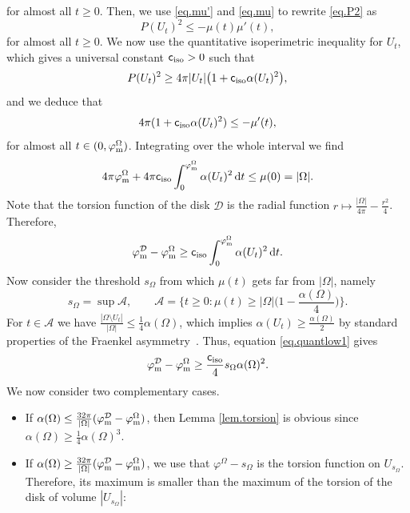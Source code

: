 \documentclass[11pt,a4paper]{amsart}
\def\dd{{\,\mathrm{d}}}
\numberwithin{figure}{section}
\numberwithin{equation}{section}
\theoremstyle{plain}%
\theoremstyle{remark}
\theoremstyle{plain}
\newcommand\cD{\mathcal D}
\newcommand\cF{\mathcal F}
\def\cD{{\mathcal D}}   \def\cE{{\mathcal E}}   \def\cF{{\mathcal F}}
\begin{document}
\begin{appendix}
		for almost all $t\geq 0$.
		Then, we use \eqref{eq.mu'} and \eqref{eq.mu} to rewrite \eqref{eq.P2} as 
		\begin{equation}
		 P(U_t)^2 \leq - \mu(t) \mu'(t),
		\end{equation}
		for almost all $t\geq 0$.
		We now use the quantitative isoperimetric inequality \cite[Theorem 1.1]{FMP} for $U_t$, which gives a universal constant $\mathsf c_{\rm iso} >0$ such that
		\[ P(U_t)^2 \geq 4\pi |U_t| \big( 1 + \mathsf c_{\rm iso} \alpha(U_t)^2 \big),\]
		and we deduce that 
		\[ 4 \pi( 1+  \mathsf{c}_{\rm iso} \alpha(U_t)^2 ) \leq - \mu'(t),\]
		for almost all $t \in (0, \varphi^\Omega_{\rm m})$. Integrating over the whole interval we find
		\[ 4 \pi \varphi^\Omega_{\rm m}  + 4 \pi \mathsf c_{\rm iso} \int_0^{\varphi^\Omega_{\rm m}} \alpha(U_t)^2 \dd t \leq \mu(0) = |\Omega|.\]
		Note that the torsion function of the disk $\cD$ is the radial function $r \mapsto \frac{|\Omega|}{4\pi} - \frac{r^2}{4}$. Therefore,
		\begin{equation}\label{eq.quantlow1}
			\varphi^{\cD}_{\rm m} - \varphi^{\Omega}_{\rm m} \geq \mathsf c_{\rm iso} \int_0^{\varphi_{\rm m}^\Omega} \alpha(U_t)^2 \dd t. 
		\end{equation}
		Now consider the threshold $s_\Omega$ from which $\mu(t)$ gets far from $|\Omega|$, namely
		\begin{equation}
			s_\Omega = \sup \mathscr A, \qquad \mathscr A = \Big\lbrace t \geq 0\colon \mu(t) \geq |\Omega | \Big( 1 - \frac{\alpha(\Omega)}{4} \Big) \Big\rbrace.
		\end{equation}
		For $t \in \mathscr{A}$ we have $ \frac{| \Omega \setminus U_t |}{|\Omega|} \leq \frac 1 4 \alpha(\Omega)$, which implies $\alpha(U_t) \geq \frac{\alpha(\Omega)}{2}$ by standard properties of the Fraenkel asymmetry~\cite[Lemma 2.8]{BP17}. Thus, equation \eqref{eq.quantlow1} gives
		\begin{equation}\label{eq.quantlow2}
			\varphi^{\cD}_{\rm m} - \varphi^{\Omega}_{\rm m} \geq \frac {\mathsf c_{\rm iso}} 4  s_\Omega \alpha(\Omega)^2.
		\end{equation}
		We now consider two complementary cases.
		\begin{itemize}
			\item [\rm (i)] If $\alpha(\Omega) \leq \frac{32 \pi}{|\Omega|} ( \varphi^{\cD}_{\rm m} - \varphi^{\Omega}_{\rm m} )$, then Lemma \ref{lem.torsion} is obvious since $\alpha(\Omega) \geq \frac14\alpha(\Omega)^3$.
			\item [\rm (ii)] If $\alpha(\Omega) \geq \frac{32 \pi}{|\Omega|} ( \varphi^{\cD}_{\rm m} - \varphi^{\Omega}_{\rm m} )$, we use that $\varphi^\Omega - s_\Omega$ is the torsion function on $U_{s_\Omega}$. Therefore, its maximum is smaller than the maximum of the torsion of the disk of volume $|U_{s_\Omega}|$:

\end{itemize}
\end{appendix}
\end{document}
